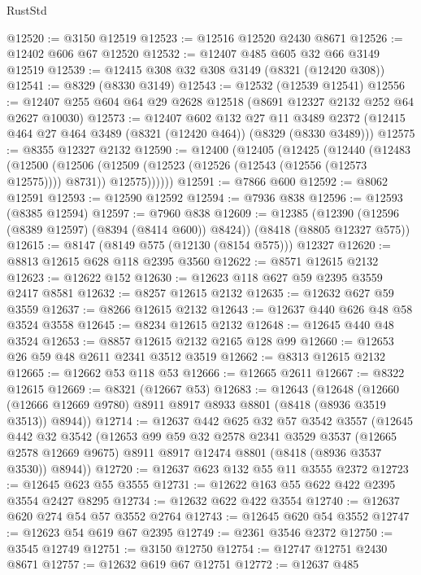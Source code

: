 \begin{lexlean}{RustStd}
\begin{coremodule}
@12520 := @3150 @12519
@12523 := @12516 @12520 @2430 @8671
@12526 := @12402 @606 @67 @12520
@12532 := @12407 @485 @605 @32 @66 @3149 @12519
@12539 := @12415 @308 @32 @308 @3149 (@8321 (@12420 @308))
@12541 := @8329 (@8330 @3149)
@12543 := @12532 (@12539 @12541)
@12556 := @12407 @255 @604 @64 @29 @2628 @12518 (@8691 @12327 @2132 @252 @64 @2627 @10030)
@12573 := @12407
    @602
    @132
    @27
    @11
    @3489
    @2372
    (@12415 @464 @27 @464 @3489 (@8321 (@12420 @464)) (@8329 (@8330 @3489)))
@12575 := @8355 @12327 @2132
@12590 := @12400
    (@12405
      (@12425
        (@12440
          (@12483
            (@12500
              (@12506
                (@12509 (@12523 (@12526 (@12543 (@12556 (@12573 @12575)))) @8731))
                @12575))))))
@12591 := @7866 @600
@12592 := @8062 @12591
@12593 := @12590 @12592
@12594 := @7936 @838
@12596 := @12593 (@8385 @12594)
@12597 := @7960 @838
@12609 := @12385
    (@12390 (@12596 (@8389 @12597) (@8394 (@8414 @600)) @8424))
    (@8418 (@8805 @12327 @575))
@12615 := @8147 (@8149 @575 (@12130 (@8154 @575))) @12327
@12620 := @8813 @12615 @628 @118 @2395 @3560
@12622 := @8571 @12615 @2132
@12623 := @12622 @152
@12630 := @12623 @118 @627 @59 @2395 @3559 @2417 @8581
@12632 := @8257 @12615 @2132
@12635 := @12632 @627 @59 @3559
@12637 := @8266 @12615 @2132
@12643 := @12637 @440 @626 @48 @58 @3524 @3558
@12645 := @8234 @12615 @2132
@12648 := @12645 @440 @48 @3524
@12653 := @8857 @12615 @2132 @2165 @128 @99
@12660 := @12653 @26 @59 @48 @2611 @2341 @3512 @3519
@12662 := @8313 @12615 @2132
@12665 := @12662 @53 @118 @53
@12666 := @12665 @2611
@12667 := @8322 @12615
@12669 := @8321 (@12667 @53)
@12683 := @12643
    (@12648
      (@12660 (@12666 @12669 @9780) @8911 @8917 @8933 @8801 (@8418 (@8936 @3519 @3513)) @8944))
@12714 := @12637
    @442
    @625
    @32
    @57
    @3542
    @3557
    (@12645
      @442
      @32
      @3542
      (@12653
        @99
        @59
        @32
        @2578
        @2341
        @3529
        @3537
        (@12665 @2578 @12669 @9675)
        @8911
        @8917
        @12474
        @8801
        (@8418 (@8936 @3537 @3530))
        @8944))
@12720 := @12637 @623 @132 @55 @11 @3555 @2372
@12723 := @12645 @623 @55 @3555
@12731 := @12622 @163 @55 @622 @422 @2395 @3554 @2427 @8295
@12734 := @12632 @622 @422 @3554
@12740 := @12637 @620 @274 @54 @57 @3552 @2764
@12743 := @12645 @620 @54 @3552
@12747 := @12623 @54 @619 @67 @2395
@12749 := @2361 @3546 @2372
@12750 := @3545 @12749
@12751 := @3150 @12750
@12754 := @12747 @12751 @2430 @8671
@12757 := @12632 @619 @67 @12751
@12772 := @12637
    @485

\end{coremodule}
\end{lexlean}
